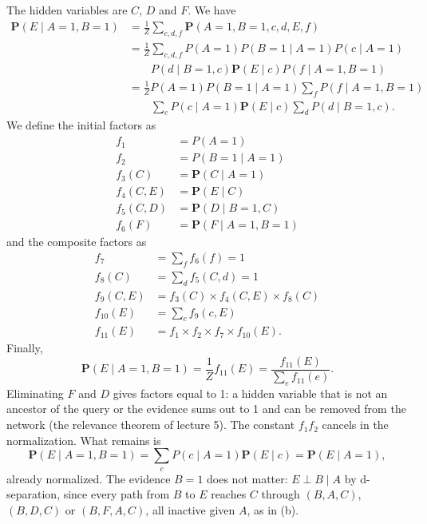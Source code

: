 \documentclass[11pt, a4paper]{exam}
\begin{document}
\begin{exercises}[1, 2][5]
\begin{parts}
    \begin{solution}
        The hidden variables are $C$, $D$ and $F$. We have
        \begin{align*}
            \mathbf{P}(E \mid A = 1, B = 1) & = \frac{1}{Z} \sum_{c, d, f} \mathbf{P}(A = 1, B = 1, c, d, E, f) \\
            & = \frac{1}{Z} \sum_{c, d, f} P(A = 1) P(B = 1 \mid A = 1) P(c \mid A = 1) \\
            & \qquad P(d \mid B = 1, c) \mathbf{P}(E \mid c) P(f \mid A = 1, B = 1) \\
            & = \frac{1}{Z} P(A = 1) P(B = 1 \mid A = 1) \sum_f P(f \mid A = 1, B = 1) \\
            & \qquad \sum_{c} P(c \mid A = 1) \mathbf{P}(E \mid c) \sum_d P(d \mid B = 1, c) .
        \end{align*}
        We define the initial factors as
        \begin{align*}
            f_1 & = P(A = 1) \\
            f_2 & = P(B = 1 \mid A = 1) \\
            f_3(C) & = \mathbf{P}(C \mid A = 1) \\
            f_4(C, E) & = \mathbf{P}(E \mid C) \\
            f_5(C, D) & = \mathbf{P}(D \mid B = 1, C) \\
            f_6(F) & = \mathbf{P}(F \mid A = 1, B = 1)
        \end{align*}
        and the composite factors as
        \begin{align*}
            f_7 & = \sum_f f_6(f) = 1 \\
            f_8(C) & = \sum_d f_5(C, d) = 1 \\
            f_9(C, E) & = f_3(C) \times f_4(C, E) \times f_8(C) \\
            f_{10}(E) & = \sum_c f_9(c, E) \\
            f_{11}(E) & = f_1 \times f_2 \times f_7 \times f_{10}(E) .
        \end{align*}
        Finally,
        \begin{equation*}
            \mathbf{P}(E \mid A = 1, B = 1) = \frac{1}{Z} f_{11}(E) = \frac{f_{11}(E)}{\sum_e f_{11}(e)}.
        \end{equation*}
        Eliminating $F$ and $D$ gives factors equal to 1: a hidden variable that is not an ancestor of the query or the evidence sums out to 1 and can be removed from the network (the relevance theorem of lecture 5). The constant $f_1 f_2$ cancels in the normalization. What remains is
        \begin{equation*}
            \mathbf{P}(E \mid A = 1, B = 1) = \sum_c P(c \mid A = 1) \mathbf{P}(E \mid c) = \mathbf{P}(E \mid A = 1),
        \end{equation*}
        already normalized. The evidence $B = 1$ does not matter: $E \perp B \mid A$ by d-separation, since every path from $B$ to $E$ reaches $C$ through $(B, A, C)$, $(B, D, C)$ or $(B, F, A, C)$, all inactive given $A$, as in (b).
    \end{solution}
\end{parts}


\end{exercises}
\end{document}
